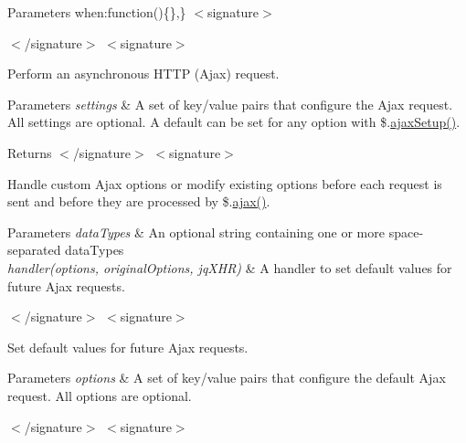 \begin{DoxyParams}{Parameters}
\textquotesingle{}when\textquotesingle{}\+:function()\{\},\} $<$signature$>$ 
 $<$/signature$>$ $<$signature$>$ \\
\hline
\end{DoxyParams}
Perform an asynchronous H\+T\+T\+P (Ajax) request.


\begin{DoxyParams}{Parameters}
{\em settings} & A set of key/value pairs that configure the Ajax request. All settings are optional. A default can be set for any option with \$.\hyperlink{jquery-1_810_82-vsdoc_8js_a3b12f4f2a83dfdae4e81bcaeaf2a2f42}{ajax\+Setup()}.\\
\hline
\end{DoxyParams}
\begin{DoxyReturn}{Returns}
$<$/signature$>$ $<$signature$>$ 

Handle custom Ajax options or modify existing options before each request is sent and before they are processed by \$.\hyperlink{_bibabook_2_scripts_2jquery_8validate-vsdoc_8js_a77004c0fdc08a5bc07afa0b099cdf6df}{ajax()}.
\end{DoxyReturn}

\begin{DoxyParams}{Parameters}
{\em data\+Types} & An optional string containing one or more space-\/separated data\+Types\\
\hline
{\em handler(options, original\+Options, jq\+X\+H\+R)} & A handler to set default values for future Ajax requests.\\
\hline
\end{DoxyParams}
$<$/signature$>$ $<$signature$>$ 

Set default values for future Ajax requests.


\begin{DoxyParams}{Parameters}
{\em options} & A set of key/value pairs that configure the default Ajax request. All options are optional.\\
\hline
\end{DoxyParams}
$<$/signature$>$ $<$signature$>$ 

